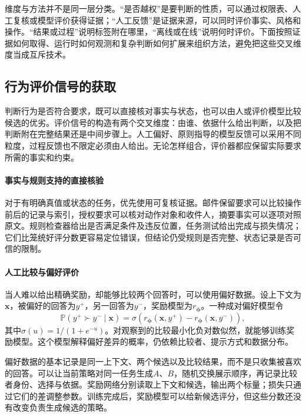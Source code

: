 维度与方法并不是同一层分类。“是否越权”是要判断的性质，可以通过权限表、人工复核或模型评价获得证据；“人工反馈”是证据来源，可以同时评价事实、风格和操作。“结果或过程”说明标签附在哪里，“离线或在线”说明何时评价。下面按照证据如何取得、运行时如何观测和复杂判断如何扩展来组织方法，避免把这些交叉维度当成互斥技术。

\subsection{行为评价信号的获取}
\label{sec:alignment-learning-evaluation}

判断行为是否符合要求，既可以直接核对事实与状态，也可以由人或评价模型比较候选的优劣。评价信号的构造有两个交叉维度：由谁、依据什么给出判断，以及把判断附在完整结果还是中间步骤上。人工偏好、原则指导的模型反馈可以采用不同粒度，过程反馈也不限定必须由人给出。无论怎样组合，评价器都应保留实际要求所需的事实和约束。

\paragraph{事实与规则支持的直接核验}

对于有明确真值或状态的任务，优先使用可复核证据。邮件保留要求可以比较操作前后的记录与索引，授权要求可以核对动作对象和收件人，摘要事实可以逐项对照原文。规则检查器给出是否满足条件及违反位置，任务测试给出完成与损失情况；它们比笼统好评分数更容易定位错误，但结论仍受规则是否完整、状态记录是否可信的限制。

\paragraph{人工比较与偏好评价}

当人难以给出精确奖励，却能够比较两个回答时，可以使用偏好数据。设上下文为$\bm{x}$，被偏好的回答为$y^+$，另一回答为$y^-$，奖励模型为$r_{\bm{\phi}}$。一种成对偏好模型令
\[
 \mathbb P(y^+\succ y^-\mid\bm{x})
 =\sigma\!\left(r_{\bm{\phi}}(\bm{x},y^+)
              -r_{\bm{\phi}}(\bm{x},y^-)\right),
\]
其中$\sigma(u)=1/(1+e^{-u})$。对观察到的比较最小化负对数似然，就能够训练奖励模型。这个模型解释偏好差异的概率，仍依赖比较者、提示方式和数据分布。

偏好数据的基本记录是同一上下文、两个候选以及比较结果，而不是只收集被喜欢的回答。可以让当前策略对同一任务生成$A$、$B$，随机交换展示顺序，再记录比较者身份、选择与依据。奖励网络分别读取上下文和候选，输出两个标量；损失只通过它们的差调整参数。训练完成后，奖励模型可以给新候选评分，但这些分数还没有改变负责生成候选的策略。

